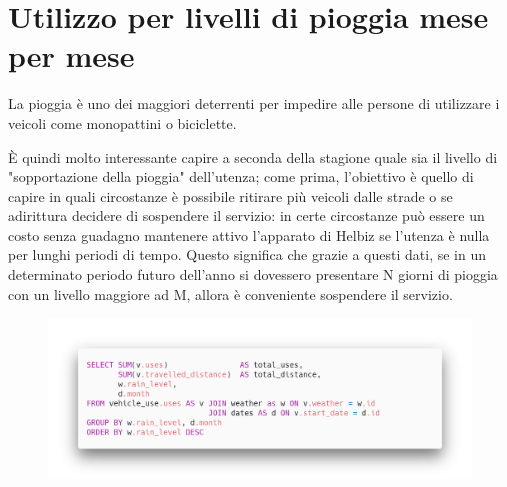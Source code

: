 \section{Utilizzo per livelli di pioggia mese per mese}
La pioggia è uno dei maggiori deterrenti per impedire alle persone di
utilizzare i veicoli come monopattini o biciclette.

È quindi molto interessante capire a seconda della stagione quale
sia il livello di "sopportazione della pioggia" dell'utenza; come prima,
l'obiettivo è quello di capire in quali circostanze è possibile ritirare
più veicoli dalle strade o se adirittura decidere di sospendere il servizio: in
certe circostanze può essere un costo senza guadagno mantenere attivo l'apparato
di Helbiz se l'utenza è nulla per lunghi periodi di tempo.
Questo significa che grazie a questi dati, se in un determinato periodo futuro
dell'anno si dovessero presentare N giorni di pioggia con un livello maggiore ad M,
allora è conveniente sospendere il servizio.
\begin{figure}[H]                                                                                                                                                            
\centering                                                                                                                                                                   
\includegraphics[width=\textwidth]{images/query2}                                                                                                                                   
\label{fig:query2}                                                                                                                                                           
\end{figure}

